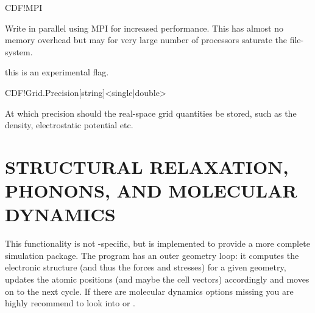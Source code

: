 \begin{fdflogicalF}{CDF!MPI}

  Write  in parallel using MPI for increased
  performance. This has almost no memory overhead but may for very
  large number of processors saturate the file-system.

  \note this is an experimental flag.

\end{fdflogicalF}

\begin{fdfentry}{CDF!Grid.Precision}[string]<single|double>

  At which precision should the real-space grid quantities be stored,
  such as the density, electrostatic potential etc.
  
\end{fdfentry}



\vspace{5pt}
\section{STRUCTURAL RELAXATION, PHONONS, AND MOLECULAR DYNAMICS}

This functionality is not \siesta-specific, but is implemented to
provide a more complete simulation package. The program has an outer
geometry loop: it computes the electronic structure (and
thus the forces and stresses) for a given geometry, updates the
atomic positions (and maybe the cell vectors) accordingly and moves on
to the next cycle.
%
If there are molecular dynamics options missing you are highly
recommend to look into  or
. 


